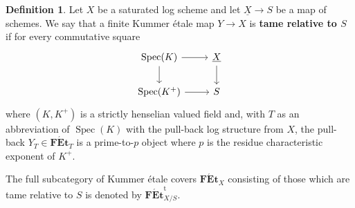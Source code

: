 \documentclass[a4paper,twoside,11pt,reqno]{amsart}
\DeclareMathOperator{\Spec}{Spec}
\newcommand{\cat}[1]{\mathbf{#1}}
\newcommand{\FEt}{\cat{F\acute{E}t}}
\newcommand{\FEtt}{{\cat{F\acute{E}t}}^{\!\mathrm{t}}}
\theoremstyle{definition}
\newtheorem{defi}[thm]{Definition}
\numberwithin{equation}{subsection}
\begin{document}
\begin{defi} \label{def:tame-log}
    Let $X$ be a saturated log scheme and let $\underline{X}\to S$ be a map of schemes. 
    We say that a finite Kummer \'etale map $Y\to X$ is {\bf tame relative to $S$} if for every commutative square
    \begin{equation} \label{eqn:tame-log-test-sq}
        \begin{tikzcd}
            \Spec(K)\ar[r] \ar[d] & \underline{X}\ar[d] \\
            \Spec(K^+) \ar[r] & S
        \end{tikzcd}
    \end{equation}
    where $(K, K^+)$ is a strictly henselian valued field and, with $T$ as an abbreviation of $\Spec(K)$ with the pull-back log structure from $X$, the pull-back $Y_T \in \FEt_{T}$ is a prime-to-$p$ object where $p$ is the residue characteristic exponent of $K^+$. 
    
    The full subcategory of Kummer \'etale covers $\FEt_X$ consisting of those which are tame relative to $S$ is denoted by $\FEtt_{X/S}$.
\end{defi}
\end{document}

